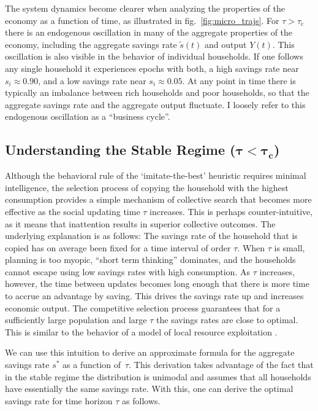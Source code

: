 The system dynamics become clearer when analyzing the properties of the 
economy as a function of time, as illustrated in fig.~\ref{fig:micro_trajs}.  
For $\tau \! > \! \tau_\mathrm{c}$ there is an endogenous oscillation in many of the aggregate properties of the economy, including the aggregate savings rate $\tilde{s}(t)$ and output $Y(t)$.  This oscillation is also visible in the behavior of individual households.  If one follows any single household it experiences epochs with both, a high savings rate near $s_i \! \approx \! 0.90$, and a low savings rate near $s_i \! \approx \! 0.05$.  At any point in time there is typically an imbalance between rich households and poor households, so that the aggregate savings rate and the aggregate output fluctuate.  I loosely refer to this endogenous oscillation as a ``business cycle''.


\subsection{Understanding the Stable Regime ($\mathbf{\tau \! < \! \tau_{c} }$)}
\label{sec:savings_stable}
Although the behavioral rule of the `imitate-the-best' heuristic requires minimal intelligence, the selection process of copying the household with the highest consumption provides a simple mechanism of collective search that becomes more effective as the social updating time $\tau$ increases.  This is perhaps counter-intuitive, as it means that inattention results in superior collective outcomes. The underlying explanation is as follows:  The  savings rate of the household that is copied has on average been fixed for a time interval of order $\tau$. When $\tau$ is small, planning is too myopic, ``short term thinking'' dominates, and the households cannot escape using low savings rates with high consumption.  As $\tau$ increases, however, the time between updates becomes long enough that there is more time to accrue an advantage by saving. This drives the savings rate up and increases economic output. The competitive selection process guarantees that for a sufficiently large population and large $\tau$ the savings rates are close to optimal. This is similar to the behavior of a model of local resource exploitation \citep{Wiedermann2015}.

We can use this intuition to derive an approximate formula for the aggregate savings rate $s^*$ as a function of~$\tau$. This derivation takes advantage of the fact that in the stable regime the distribution is unimodal and assumes that all households have essentially the same savings rate. With this, one can derive the optimal savings rate for time horizon $\tau$ as follows.\\ 

